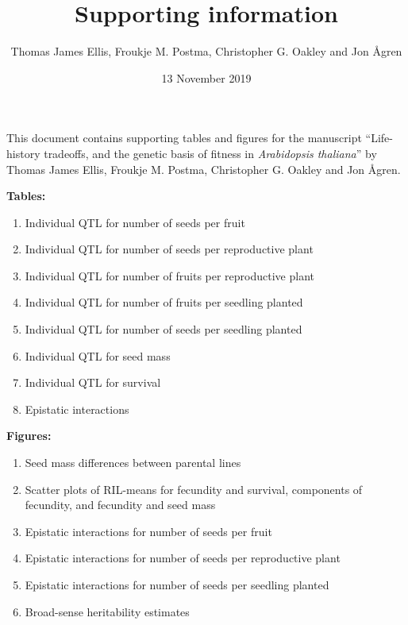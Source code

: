 \documentclass[]{article}
\title{Supporting information}
\author{Thomas James Ellis, Froukje M. Postma, Christopher G. Oakley and Jon
Ågren}
\date{13 November 2019}
\providecommand{\tightlist}{%
  \setlength{\itemsep}{0pt}\setlength{\parskip}{0pt}}
\begin{document}
\maketitle

This document contains supporting tables and figures for the manuscript
``Life-history tradeoffs, and the genetic basis of fitness in
\emph{Arabidopsis thaliana}'' by Thomas James Ellis, Froukje M. Postma,
Christopher G. Oakley and Jon Ågren.

\textbf{Tables:}

\begin{enumerate}
\def\labelenumi{\arabic{enumi}.}
\tightlist
\item
  Individual QTL for number of seeds per fruit
\item
  Individual QTL for number of seeds per reproductive plant
\item
  Individual QTL for number of fruits per reproductive plant
\item
  Individual QTL for number of fruits per seedling planted
\item
  Individual QTL for number of seeds per seedling planted
\item
  Individual QTL for seed mass
\item
  Individual QTL for survival
\item
  Epistatic interactions
\end{enumerate}

\textbf{Figures:}

\begin{enumerate}
\def\labelenumi{\arabic{enumi}.}
\tightlist
\item
  Seed mass differences between parental lines
\item
  Scatter plots of RIL-means for fecundity and survival, components of
  fecundity, and fecundity and seed mass
\item
  Epistatic interactions for number of seeds per fruit
\item
  Epistatic interactions for number of seeds per reproductive plant
\item
  Epistatic interactions for number of seeds per seedling planted
\item
  Broad-sense heritability estimates
\end{enumerate}

\newpage
\end{document}
